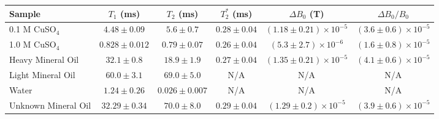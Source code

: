 \begin{tabular}{lccccc}
\hline
Sample & $T_1$ (ms) & $T_2$ (ms) & $T_2^*$ (ms) & $\Delta B_0$ (T) & $\Delta B_0 / B_0$ \\
\hline
0.1 M CuSO$_4$ & $4.48 \pm 0.09$ & $5.6 \pm 0.7$ & $0.28 \pm 0.04$ & $(1.18 \pm 0.21) \times 10^{-5}$ & $(3.6 \pm 0.6) \times 10^{-5}$ \\
1.0 M CuSO$_4$ & $0.828 \pm 0.012$ & $0.79 \pm 0.07$ & $0.26 \pm 0.04$ & $(5.3 \pm 2.7) \times 10^{-6}$ & $(1.6 \pm 0.8) \times 10^{-5}$ \\
Heavy Mineral Oil & $32.1 \pm 0.8$ & $18.9 \pm 1.9$ & $0.27 \pm 0.04$ & $(1.35 \pm 0.21) \times 10^{-5}$ & $(4.1 \pm 0.6) \times 10^{-5}$ \\
Light Mineral Oil & $60.0 \pm 3.1$ & $69.0 \pm 5.0$ & N/A & N/A & N/A \\
Water & $1.24 \pm 0.26$ & $0.026 \pm 0.007$ & N/A & N/A & N/A \\
Unknown Mineral Oil & $32.29 \pm 0.34$ & $70.0 \pm 8.0$ & $0.29 \pm 0.04$ & $(1.29 \pm 0.2) \times 10^{-5}$ & $(3.9 \pm 0.6) \times 10^{-5}$ \\
\hline
\end{tabular}